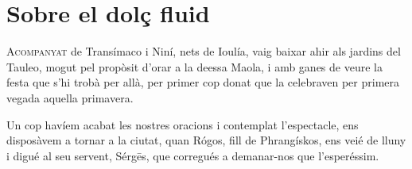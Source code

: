 \setlength{\parindent}{20pt}

\chapter{Sobre el dolç fluid}


\lettrine[loversize=0.2, lines=2]{A}{companyat} de Transímaco i Niní, nets de Ioulía, vaig baixar ahir als jardins del Tauleo, mogut pel propòsit d'orar a la deessa Maola, i amb ganes de veure la festa que s'hi trobà per allà, per primer cop donat que la celebraven per primera vegada aquella primavera.

Un cop havíem acabat les nostres oracions i contemplat l’espectacle, ens disposàvem a tornar a la ciutat, quan Rógos, fill de Phrangískos, ens veié de lluny i digué al seu servent, Sérgēs, que corregués a demanar-nos que l’esperéssim.

